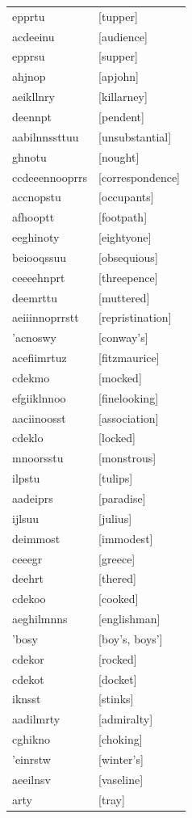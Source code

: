 \documentclass{article}
\begin{document}
\begin{tabular}{ll}
epprtu & [tupper] \\
acdeeinu & [audience] \\
epprsu & [supper] \\
ahjnop & [apjohn] \\
aeikllnry & [killarney] \\
deennpt & [pendent] \\
aabilnnssttuu & [unsubstantial] \\
ghnotu & [nought] \\
ccdeeennooprrs & [correspondence] \\
accnopstu & [occupants] \\
afhooptt & [footpath] \\
eeghinoty & [eightyone] \\
beiooqssuu & [obsequious] \\
ceeeehnprt & [threepence] \\
deemrttu & [muttered] \\
aeiiinnoprrstt & [repristination] \\
'acnoswy & [conway's] \\
acefiimrtuz & [fitzmaurice] \\
cdekmo & [mocked] \\
efgiiklnnoo & [finelooking] \\
aaciinoosst & [association] \\
cdeklo & [locked] \\
mnoorsstu & [monstrous] \\
ilpstu & [tulips] \\
aadeiprs & [paradise] \\
ijlsuu & [julius] \\
deimmost & [immodest] \\
ceeegr & [greece] \\
deehrt & [thered] \\
cdekoo & [cooked] \\
aeghilmnns & [englishman] \\
'bosy & [boy's, boys'] \\
cdekor & [rocked] \\
cdekot & [docket] \\
iknsst & [stinks] \\
aadilmrty & [admiralty] \\
cghikno & [choking] \\
'einrstw & [winter's] \\
aeeilnsv & [vaseline] \\
arty & [tray] \\

\end{tabular}
\end{document}
